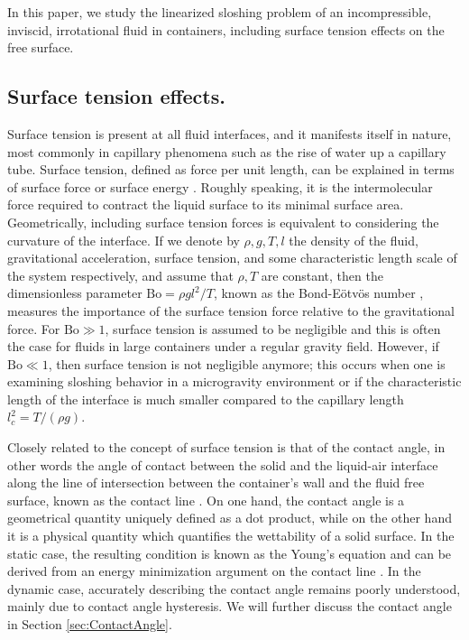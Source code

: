 \documentclass[letterpaper, 12pt]{amsart}
\newcommand{\bond}{\mathrm{Bo}}
\begin{document}
In this paper, we study the linearized sloshing problem of an incompressible, inviscid, irrotational fluid in containers, including surface tension effects on the free surface.

\subsection{Surface tension effects.}\label{sec:SurfTenEff}
Surface tension is present at all fluid interfaces, and it manifests itself in nature, most commonly in capillary phenomena such as the rise of water up a capillary tube. Surface tension, defined as force per unit length, can be explained in terms of surface force or surface energy \cite{Leal:2007aa, Bush:2013aa}. Roughly speaking, it is the intermolecular force required to contract the liquid surface to its minimal surface area. Geometrically, including surface tension forces is equivalent to considering the curvature of the interface. If we denote by $\rho,g,T,l$ the density of the fluid, gravitational acceleration, surface tension, and some characteristic length scale of the system respectively, and assume that $\rho,T$ are constant, then the dimensionless parameter $\bond = \rho gl^2/T $, known as the Bond-E\"otv\"os number \cite{Ibrahim:2005aa}, measures the importance of the surface tension force relative to the gravitational force. For $\bond\gg 1$, surface tension is assumed to be negligible and this is often the case for fluids in large containers under a regular gravity field. However,  if $\bond\ll 1$, then surface tension is not negligible anymore; this occurs when one is examining sloshing behavior in a microgravity environment or if the characteristic length of the interface is much smaller compared to the capillary length $l_c^2=T/(\rho g)$. 

Closely related to the concept of surface tension is that of the contact angle, in other words the angle of contact between the solid and the liquid-air interface along the line of intersection between the container's wall and the fluid free surface, known as the contact line \cite{Dussan:1979aa}. On one hand, the contact angle is a geometrical quantity uniquely defined as a dot product, while on the other hand it is a physical quantity which quantifies the wettability of a solid surface. In the static case, the resulting condition is known as the Young's equation and can be derived from an energy minimization argument on the contact line \cite{Moiseyev:1968aa, Finn:1986aa}. In the dynamic case, accurately describing the contact angle remains poorly understood, mainly due to contact angle hysteresis. We will further discuss the contact angle  in Section \ref{sec:ContactAngle}. 
\end{document}
